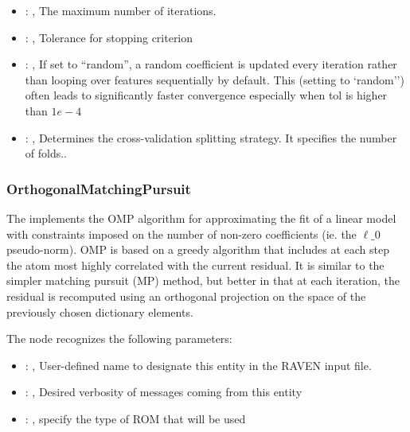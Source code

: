 \begin{itemize}
    \item {}: , 
      The maximum number of iterations.

    \item {}: , 
      Tolerance for stopping criterion

    \item {}: , 
      If set to ``random'', a random coefficient is updated every iteration
      rather than looping over features sequentially by default. This (setting to `random'')
      often leads to significantly faster convergence especially when tol is higher than $1e-4$

    \item {}: , 
      Determines the cross-validation splitting strategy.
      It specifies the number of folds..
  \end{itemize}


\subsubsection{OrthogonalMatchingPursuit}
  The                          implements the OMP algorithm for
  approximating the fit of a                         linear model with constraints imposed on the
  number of non-zero                         coefficients (ie. the $\ell\_0$ pseudo-norm). OMP is
  based on a greedy                         algorithm that includes at each step the atom most
  highly correlated                         with the current residual. It is similar to the simpler
  matching                         pursuit (MP) method, but better in that at each iteration, the
  residual                         is recomputed using an orthogonal projection on the space of the
  previously chosen dictionary elements.

  The  node recognizes the following parameters:
    \begin{itemize}
      \item {}: , 
        User-defined name to designate this entity in the RAVEN input file.
      \item {}: , 
        Desired verbosity of messages coming from this entity
      \item {}: , 
        specify the type of ROM that will be used
  \end{itemize}

